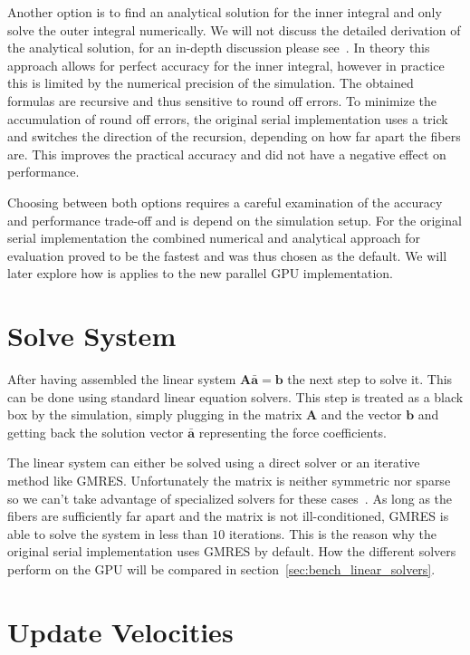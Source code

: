 Another option is to find an analytical solution for the inner integral and only solve the outer integral numerically. We will not discuss the detailed derivation of the analytical solution, for an in-depth discussion please see~\cite{Tornberg2006}. In theory this approach allows for perfect accuracy for the inner integral, however in practice this is limited by the numerical precision of the simulation. The obtained formulas are recursive and thus sensitive to round off errors. To minimize the accumulation of round off errors, the original serial implementation uses a trick and switches the direction of the recursion, depending on how far apart the fibers are. This improves the practical accuracy and did not have a negative effect on performance.

Choosing between both options requires a careful examination of the accuracy and performance trade-off and is depend on the simulation setup. For the original serial implementation the combined numerical and analytical approach for evaluation proved to be the fastest and was thus chosen as the default. We will later explore how is applies to the new parallel GPU implementation.

\section{Solve System}

After having assembled the linear system $\mathbf{A}\mathbf{\bar{a}}=\mathbf{b}$ the next step to solve it. This can be done using standard linear equation solvers. This step is treated as a black box by the simulation, simply plugging in the matrix $\mathbf{A}$ and the vector $\mathbf{b}$ and getting back the solution vector $\mathbf{\bar{a}}$ representing the force coefficients.

The linear system can either be solved using a direct solver or an iterative method like GMRES. Unfortunately the matrix is neither symmetric nor sparse so we can't take advantage of specialized solvers for these cases~\cite{Tornberg2006}. As long as the fibers are sufficiently far apart and the matrix is not ill-conditioned, GMRES is able to solve the system in less than $10$ iterations. This is the reason why the original serial implementation uses GMRES by default. How the different solvers perform on the GPU will be compared in section~\ref{sec:bench_linear_solvers}.

\section{Update Velocities}

